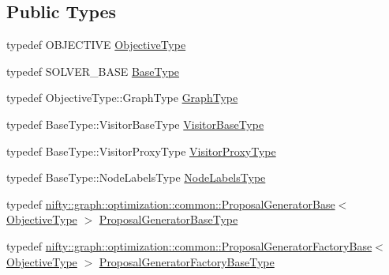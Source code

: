 \subsection*{Public Types}
\begin{DoxyCompactItemize}
\item 
typedef O\+B\+J\+E\+C\+T\+I\+V\+E \hyperlink{classnifty_1_1graph_1_1optimization_1_1common_1_1detail__cc__fusion_1_1CcFusionMoveBasedImpl_a963bf8b5310665f1aa1d3521d6f766a0}{Objective\+Type}
\item 
typedef S\+O\+L\+V\+E\+R\+\_\+\+B\+A\+S\+E \hyperlink{classnifty_1_1graph_1_1optimization_1_1common_1_1detail__cc__fusion_1_1CcFusionMoveBasedImpl_aa164d1fa9a818334d0134bc2421f3736}{Base\+Type}
\item 
typedef Objective\+Type\+::\+Graph\+Type \hyperlink{classnifty_1_1graph_1_1optimization_1_1common_1_1detail__cc__fusion_1_1CcFusionMoveBasedImpl_a76c88a1976ccfa02b9361f428ce30bc5}{Graph\+Type}
\item 
typedef Base\+Type\+::\+Visitor\+Base\+Type \hyperlink{classnifty_1_1graph_1_1optimization_1_1common_1_1detail__cc__fusion_1_1CcFusionMoveBasedImpl_afbc19ace9c1055cf28b15a6d6dd050e7}{Visitor\+Base\+Type}
\item 
typedef Base\+Type\+::\+Visitor\+Proxy\+Type \hyperlink{classnifty_1_1graph_1_1optimization_1_1common_1_1detail__cc__fusion_1_1CcFusionMoveBasedImpl_a7316953ca74bcfbbc177b560775e7327}{Visitor\+Proxy\+Type}
\item 
typedef Base\+Type\+::\+Node\+Labels\+Type \hyperlink{classnifty_1_1graph_1_1optimization_1_1common_1_1detail__cc__fusion_1_1CcFusionMoveBasedImpl_a707b7d8fc7c52c9092337ba7910ea484}{Node\+Labels\+Type}
\item 
typedef \hyperlink{classnifty_1_1graph_1_1optimization_1_1common_1_1ProposalGeneratorBase}{nifty\+::graph\+::optimization\+::common\+::\+Proposal\+Generator\+Base}$<$ \hyperlink{classnifty_1_1graph_1_1optimization_1_1common_1_1detail__cc__fusion_1_1CcFusionMoveBasedImpl_a963bf8b5310665f1aa1d3521d6f766a0}{Objective\+Type} $>$ \hyperlink{classnifty_1_1graph_1_1optimization_1_1common_1_1detail__cc__fusion_1_1CcFusionMoveBasedImpl_ac65b1dd4783322f1fd38e42e10272f44}{Proposal\+Generator\+Base\+Type}
\item 
typedef \hyperlink{classnifty_1_1graph_1_1optimization_1_1common_1_1ProposalGeneratorFactoryBase}{nifty\+::graph\+::optimization\+::common\+::\+Proposal\+Generator\+Factory\+Base}$<$ \hyperlink{classnifty_1_1graph_1_1optimization_1_1common_1_1detail__cc__fusion_1_1CcFusionMoveBasedImpl_a963bf8b5310665f1aa1d3521d6f766a0}{Objective\+Type} $>$ \hyperlink{classnifty_1_1graph_1_1optimization_1_1common_1_1detail__cc__fusion_1_1CcFusionMoveBasedImpl_a947607cc31008070837e3889069f9f94}{Proposal\+Generator\+Factory\+Base\+Type}
\end{DoxyCompactItemize}

